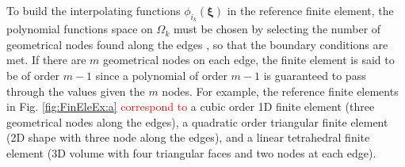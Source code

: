 To build the interpolating functions $\phi_{i_k}(\boldsymbol{\xi})$ in the reference finite element, the polynomial functions space on $\Omega_k$ must be chosen by selecting the number of geometrical nodes found along the  edges \cite{larson_finite_2013}, so that the boundary conditions are met. If there are $m$ geometrical nodes on each edge, the finite element is said to be of order $m-1$ since a polynomial of order $m-1$ is guaranteed to pass through the values given the  $m$ nodes. For example, the reference finite elements in Fig. \ref{fig:FinEleEx:a} \textcolor{red}{correspond to} a cubic order 1D finite element (three geometrical nodes along the edges), a quadratic order triangular finite element (2D shape with three node along the edges), and a linear tetrahedral finite element (3D volume with four triangular faces and two nodes at each edge).

